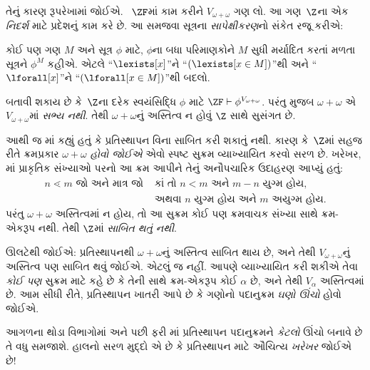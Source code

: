 તેનું કારણ રૂપરેખામાં જોઈએ. ~$\ZF$માં કામ કરીને
$V_{\omega+\omega}$ ગણ લો. આ ગણ~$\Z$ના એક \emph{નિદર્શ}
માટે પ્રદેશનું કામ કરે છે. આ સમજવા સૂત્રના
\emph{સાપેક્ષીકરણ}નો સંકેત રજૂ કરીએ:
\begin{defn}
	કોઈ પણ ગણ $M$ અને સૂત્ર $\phi$ માટે, $\phi$ના બધા
	પરિમાણકોને $M$ સુધી મર્યાદિત કરતાં મળતા સૂત્રને $\phi^M$
	કહીએ. એટલે ``$\lexists[x]$''ને ``$(\lexists[x \in M])$''થી
	અને ``$\lforall[x]$''ને ``$(\lforall[x \in M])$''થી બદલો.
\end{defn}\noindent
બતાવી શકાય છે કે~$\Z$ના દરેક સ્વયંસિદ્ધિ $\phi$ માટે
$\ZF \vdash
\phi^{V_{\omega+\omega}}$. પરંતુ
 મુજબ $\omega+\omega$
એ $V_{\omega+\omega}$માં \emph{સભ્ય નથી}. તેથી
$\omega+\omega$નું અસ્તિત્વ ન હોવું $\Z$ સાથે સુસંગત છે.

આથી જ માં કહ્યું હતું કે
પ્રતિસ્થાપન વિના સાબિત કરી શકાતું નથી. કારણ કે~$\Z$માં
સહજ રીતે ક્રમપ્રકાર $\omega+\omega$ \emph{હોવો જોઈએ} એવો
સ્પષ્ટ સુક્રમ વ્યાખ્યાયિત કરવો સરળ છે. ખરેખર,
માં પ્રાકૃતિક સંખ્યાઓ પરનો આ
ક્રમ આપીને તેનું અનૌપચારિક ઉદાહરણ આપ્યું હતું:
\begin{align*}
	n \lessdot m \text{ જો અને માત્ર જો }&\text{કાં તો }n < m\text{ અને }m-n\text{ યુગ્મ હોય,}\\
	& \text{અથવા $n$ યુગ્મ હોય અને $m$ અયુગ્મ હોય.}
\end{align*}
પરંતુ $\omega+\omega$ અસ્તિત્વમાં ન હોય, તો આ સુક્રમ કોઈ
પણ ક્રમવાચક સંખ્યા સાથે ક્રમ-એકરૂપ નથી. તેથી $\Z$માં
\emph{સાબિત થતું નથી}.

ઊલટેથી જોઈએ: પ્રતિસ્થાપનથી $\omega+\omega$નું અસ્તિત્વ
સાબિત થાય છે, અને તેથી $V_{\omega+\omega}$નું અસ્તિત્વ પણ
સાબિત થવું જોઈએ. એટલું જ નહીં. આપણે વ્યાખ્યાયિત કરી શકીએ
તેવા \emph{કોઈ પણ} સુક્રમ માટે
 કહે છે કે
તેની સાથે ક્રમ-એકરૂપ કોઈ $\alpha$ છે, અને તેથી $V_\alpha$
અસ્તિત્વમાં છે. આમ સીધી રીતે, પ્રતિસ્થાપન ખાતરી આપે છે કે
ગણોનો પદાનુક્રમ \emph{ઘણો ઊંચો} હોવો જોઈએ.

આગળના થોડા વિભાગોમાં અને પછી ફરી
માં પ્રતિસ્થાપન પદાનુક્રમને
\emph{કેટલો} ઊંચો બનાવે છે તે વધુ સમજાશે. હાલનો સરળ મુદ્દો
એ છે કે પ્રતિસ્થાપન માટે ઔચિત્ય \emph{ખરેખર} જોઈએ છે!
\endgroup

\begingroup
\makeatletter{}\makeatother

\label{guunit:OLP-0568}


